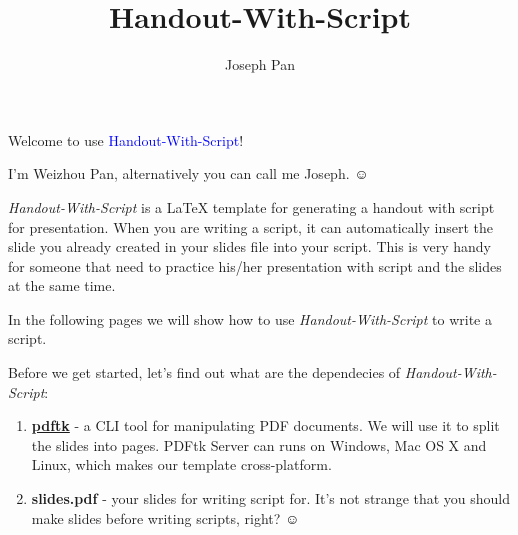 \documentclass[10pt]{scrartcl}
\begin{document}
\title{Handout-With-Script}

\author{Joseph Pan}

\maketitle

\begin{myscript}

  Welcome to use \textcolor{blue}{Handout-With-Script}! 

  I'm Weizhou Pan, alternatively you can call me Joseph. $\smiley$

\end{myscript}

\begin{myscript}
  \textsl{Handout-With-Script} is a \LaTeX{} template for generating a handout
  with script for presentation. When you are writing a script, it can
  automatically insert the slide you already created in your slides file into
  your script. This is very handy for someone that need to practice his/her
  presentation with script and the slides at the same time.

  In the following pages we will show how to use \textsl{Handout-With-Script} to
  write a script.
\end{myscript}

\begin{myscript}
  Before we get started, let's find out what are the dependecies of 
  \textsl{Handout-With-Script}: 

  \begin{enumerate}
  \item \href{http://www.pdflabs.com/tools/pdftk-the-pdf-toolkit/}{\textbf{pdftk}} -
    a CLI tool for manipulating PDF documents. We will use it to split the
    slides into pages. PDFtk Server can runs on Windows, Mac OS X and
    Linux, which makes our template cross-platform. \click
  \item \textbf{slides.pdf} - your slides for writing script for. It's not
    strange that you should make slides before writing scripts, right? $\smiley$
  \end{enumerate}
\end{myscript}
\end{document}
